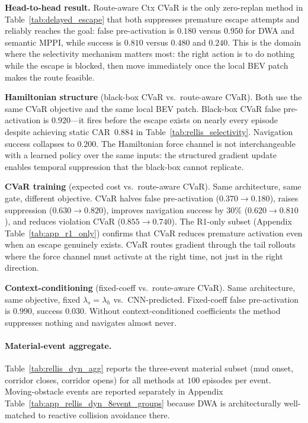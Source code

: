 \textbf{Head-to-head result.}
Route-aware Ctx CVaR is the only zero-replan method in
Table~\ref{tab:delayed_escape} that both suppresses premature escape attempts
and reliably reaches the goal: false pre-activation is $0.180$ versus
$0.950$ for DWA and semantic MPPI, while success is $0.810$ versus
$0.480$ and $0.240$.
This is the domain where the selectivity mechanism matters most: the right
action is to do nothing while the escape is blocked, then move immediately
once the local BEV patch makes the route feasible.

\textbf{Hamiltonian structure} (black-box CVaR vs.\ route-aware CVaR).
Both use the same CVaR objective and the same local BEV patch.
Black-box CVaR false pre-activation is $0.920$---it fires before the
escape exists on nearly every episode despite achieving static
CAR~$0.884$ in Table~\ref{tab:rellis_selectivity}.
Navigation success collapses to $0.200$.
The Hamiltonian force channel is not interchangeable with a learned
policy over the same inputs: the structured gradient update enables
temporal suppression that the black-box cannot replicate.

\textbf{CVaR training} (expected cost vs.\ route-aware CVaR).
Same architecture, same gate, different objective.
CVaR halves false pre-activation ($0.370\to0.180$), raises suppression
($0.630\to0.820$), improves navigation success by $30\%$
($0.620\to0.810$), and reduces violation CVaR ($0.855\to0.740$).
The R1-only subset (Appendix Table~\ref{tab:app_r1_only}) confirms that
CVaR reduces premature activation even when an escape genuinely
exists.
CVaR routes gradient through the tail rollouts where the force channel
must activate at the right time, not just in the right direction.

\textbf{Context-conditioning} (fixed-coeff vs.\ route-aware CVaR).
Same architecture, same objective, fixed $\lambda_s{=}\lambda_h$ vs.\
CNN-predicted.
Fixed-coeff false pre-activation is $0.990$, success $0.030$.
Without context-conditioned coefficients the method suppresses nothing
and navigates almost never.

\paragraph{Material-event aggregate.}
Table~\ref{tab:rellis_dyn_agg} reports the three-event material
subset (mud onset, corridor closes, corridor opens) for all methods
at $100$ episodes per event.
Moving-obstacle events are reported separately in
Appendix Table~\ref{tab:app_rellis_dyn_8event_groups} because DWA is
architecturally well-matched to reactive collision avoidance there.

